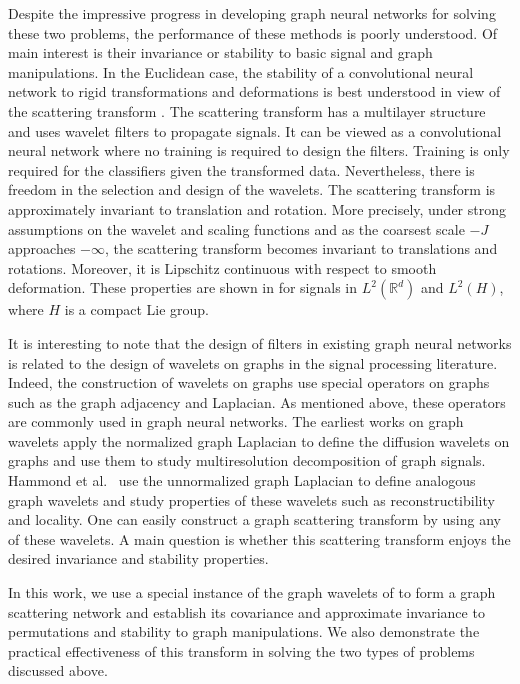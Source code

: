 \documentclass{article}
\def\RR{\mathbb{R}}
\begin{document}
Despite the impressive progress in developing graph neural networks for solving these two problems, the performance of these methods is poorly understood. Of main interest is their invariance or stability to basic signal and graph manipulations. In the Euclidean case, the stability of a convolutional neural network \cite{GooBC16} to {rigid transformations and deformations} is best understood in view of the scattering transform \cite{Mal13}. The scattering transform has a multilayer structure and uses wavelet filters to propagate signals. It can be viewed as a convolutional neural network where no training is required to design the filters. Training is only required for the classifiers given the transformed data. Nevertheless, there is freedom in the selection and design of the wavelets. 
The scattering transform is approximately invariant to translation and rotation. More precisely, under strong assumptions on the wavelet and scaling functions and as the coarsest scale $-J$ approaches $-\infty$, the scattering transform becomes invariant to translations and rotations. Moreover, it is Lipschitz continuous with respect to smooth deformation. These properties are shown in \cite{Mal13} for signals in $L^2(\RR^d)$ and $L^2(H)$, where $H$ is a compact Lie group. 

It is interesting to note that the design of filters in existing graph neural networks is related to the design of wavelets on graphs in the signal processing literature. Indeed, the construction of wavelets on graphs use special operators on graphs such as the graph adjacency and Laplacian. As mentioned above, these operators are commonly used in graph neural networks.
The earliest works on graph wavelets \cite{CoiM06,MahM06} apply the normalized graph Laplacian to define the diffusion wavelets on graphs and use them to study multiresolution decomposition of graph signals. Hammond et al.~\cite{HamVG11} use the unnormalized graph Laplacian to define analogous graph wavelets and study properties of these wavelets such as reconstructibility and locality. One can easily construct a graph scattering transform by using any of these wavelets. A main question is whether this scattering transform enjoys the desired invariance and stability properties. 

In this work, we use a special instance of the graph wavelets of \cite{HamVG11} to form a graph scattering network and establish its covariance and approximate invariance to permutations and stability to graph manipulations. We also demonstrate the practical effectiveness of this transform in solving the two types of problems discussed above.
\end{document}
